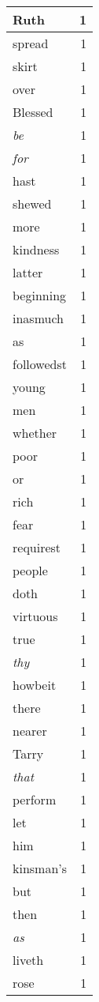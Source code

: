 \begin{center}
\begin{longtable}{l|r}
Ruth & 1 \\ \hline
spread & 1 \\ \hline
skirt & 1 \\ \hline
over & 1 \\ \hline
Blessed & 1 \\ \hline
\emph{be} & 1 \\ \hline
\emph{for} & 1 \\ \hline
hast & 1 \\ \hline
shewed & 1 \\ \hline
more & 1 \\ \hline
kindness & 1 \\ \hline
latter & 1 \\ \hline
beginning & 1 \\ \hline
inasmuch & 1 \\ \hline
as & 1 \\ \hline
followedst & 1 \\ \hline
young & 1 \\ \hline
men & 1 \\ \hline
whether & 1 \\ \hline
poor & 1 \\ \hline
or & 1 \\ \hline
rich & 1 \\ \hline
fear & 1 \\ \hline
requirest & 1 \\ \hline
people & 1 \\ \hline
doth & 1 \\ \hline
virtuous & 1 \\ \hline
true & 1 \\ \hline
\emph{thy} & 1 \\ \hline
howbeit & 1 \\ \hline
there & 1 \\ \hline
nearer & 1 \\ \hline
Tarry & 1 \\ \hline
\emph{that} & 1 \\ \hline
perform & 1 \\ \hline
let & 1 \\ \hline
him & 1 \\ \hline
kinsman's & 1 \\ \hline
but & 1 \\ \hline
then & 1 \\ \hline
\emph{as} & 1 \\ \hline
liveth & 1 \\ \hline
rose & 1 \\ \hline

\end{longtable}
\end{center}
